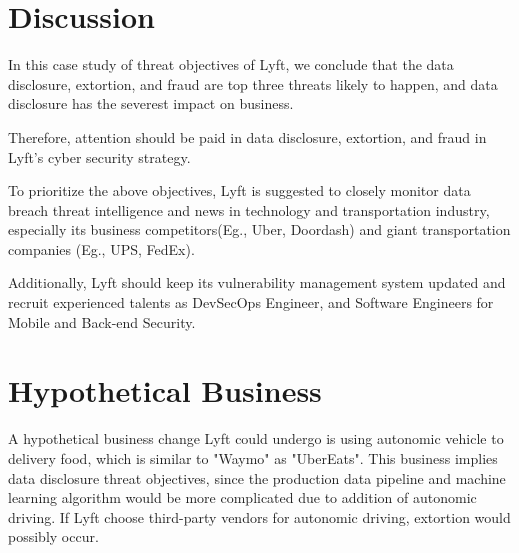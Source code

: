 \documentclass[11pt]{article}
\begin{document}
\section{Discussion}


In this case study of threat objectives of Lyft, we conclude that the data disclosure, extortion, and fraud are top three threats likely to happen, and data disclosure has the severest impact on business.

Therefore, attention should be paid in data disclosure, extortion, and fraud in Lyft's cyber security strategy.

To prioritize the above objectives, Lyft is suggested to closely monitor data breach threat intelligence and news in technology and transportation industry, especially its business competitors(Eg., Uber, Doordash) and giant transportation companies (Eg., UPS, FedEx). 

Additionally, Lyft should keep its vulnerability management system updated and recruit experienced talents as DevSecOps Engineer, and Software Engineers for Mobile and Back-end Security.




\section{Hypothetical Business}

A hypothetical business change Lyft could undergo is using autonomic vehicle to delivery food, which is similar to "Waymo" as "UberEats". This business implies data disclosure threat objectives, since the production data pipeline and machine learning algorithm would be more complicated due to addition of autonomic driving. If Lyft choose third-party vendors for autonomic driving, extortion would possibly occur.



\end{document}
